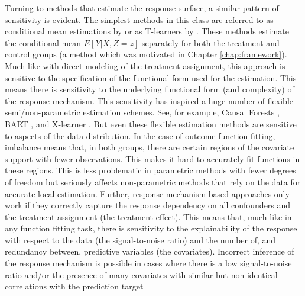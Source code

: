\documentclass[../main.tex]{subfiles}
\begin{document}
\vspace{\baselineskip}
Turning to methods that estimate the response surface, a similar pattern of sensitivity is evident. The simplest methods in this class are referred to as conditional mean estimations by \textcite{Knaus2018MachineEvidence} or as T-learners by \textcite{Kunzel2019MetalearnersLearning}. These methods estimate the conditional mean  \( E \left[ Y \vert  X, Z=z \right]  \)  separately for both the treatment and control groups (a method which was motivated in Chapter \ref{chap:framework}). Much like with direct modeling of the treatment assignment, this approach is sensitive to the specification of the functional form used for the estimation. This means there is sensitivity to the underlying functional form (and complexity) of the response mechanism. This sensitivity has inspired a huge number of flexible semi/non-parametric estimation schemes. See, for example, Causal Forests \parencite{Athey2018ApproximateDimensions}, BART \parencite{Hill2011BayesianInference}, and X-learner \parencite{Kunzel2019MetalearnersLearning}. But even these flexible estimation methods are sensitive to aspects of the data distribution. In the case of outcome function fitting, imbalance means that, in both groups, there are certain regions of the covariate support with fewer observations. This makes it hard to accurately fit functions in these regions. This is less problematic in parametric methods with fewer degrees of freedom but seriously affects non-parametric methods that rely on the data for accurate local estimation. Further, response mechanism-based approaches only work if they correctly capture the response dependency on all confounders and the treatment assignment (the treatment effect). This means that, much like in any function fitting task, there is sensitivity to the explainability of the response with respect to the data (the signal-to-noise ratio) and the number of, and redundancy between, predictive variables (the covariates). Incorrect inference of the response mechanism is possible in cases where there is a low signal-to-noise ratio and/or the presence of many covariates with similar but non-identical correlations with the prediction target\par
\end{document}
